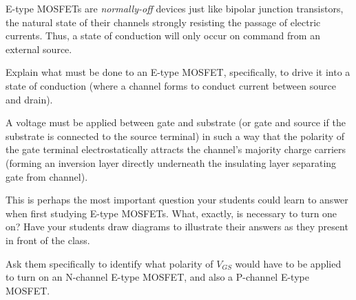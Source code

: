 

E-type MOSFETs are {\it normally-off} devices just like bipolar junction transistors, the natural state of their channels strongly resisting the passage of electric currents.  Thus, a state of conduction will only occur on command from an external source.

Explain what must be done to an E-type MOSFET, specifically, to drive it into a state of conduction (where a channel forms to conduct current between source and drain).







A voltage must be applied between gate and substrate (or gate and source if the substrate is connected to the source terminal) in such a way that the polarity of the gate terminal electrostatically attracts the channel's majority charge carriers (forming an inversion layer directly underneath the insulating layer separating gate from channel).







This is perhaps the most important question your students could learn to answer when first studying E-type MOSFETs.  What, exactly, is necessary to turn one on?  Have your students draw diagrams to illustrate their answers as they present in front of the class.

Ask them specifically to identify what polarity of $V_{GS}$ would have to be applied to turn on an N-channel E-type MOSFET, and also a P-channel E-type MOSFET.




